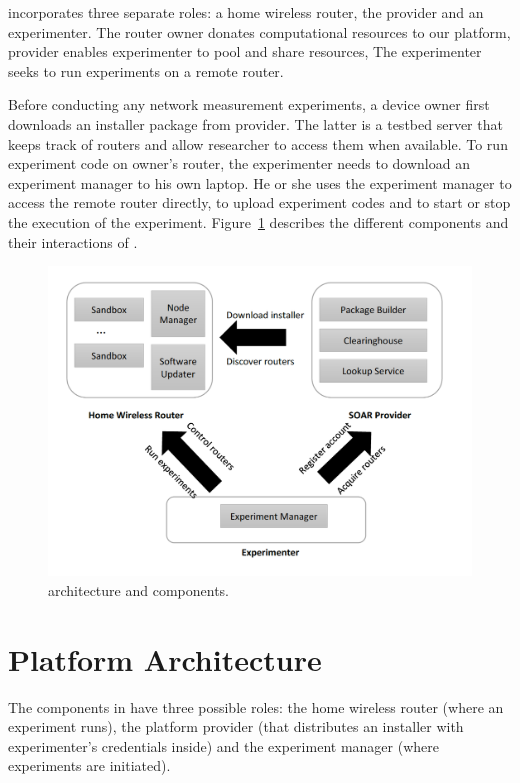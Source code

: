 \sysname incorporates three separate roles: a home wireless router, the \sysname provider and an experimenter. The router owner donates computational resources to our platform, \sysname provider enables experimenter to pool and share resources, The experimenter seeks to run experiments on a remote router.

Before conducting any network measurement experiments, a device owner first downloads an installer package from \sysname provider. The latter is a testbed server that keeps track of routers and allow researcher to access them when available. To run experiment code on owner's router, the experimenter needs to download an experiment manager to his own laptop. He or she uses the experiment manager to access the remote router directly, to upload experiment codes and to start or stop the execution of the experiment. Figure~\ref{fig-arch} describes the different components and their interactions of \sysname.

\begin{figure}%
\centering
\includegraphics[width=0.8\columnwidth]{figure/soar-arch.png}
\caption{\sysname architecture and components.}
\label{fig-arch}
\end{figure}

\section{Platform Architecture}
The components in \sysname have three possible roles: the home wireless router (where an experiment runs), the platform provider (that distributes an installer with experimenter's credentials inside) and the experiment manager (where experiments are initiated).

